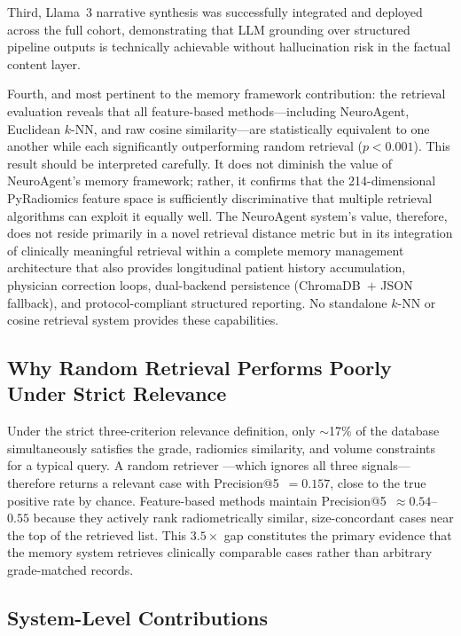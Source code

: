 \documentclass[journal]{IEEEtran}
\begin{document}
Third, Llama~3 narrative synthesis was successfully integrated and
deployed across the full cohort, demonstrating that LLM grounding over
structured pipeline outputs is technically achievable without hallucination
risk in the factual content layer.

Fourth, and most pertinent to the memory framework contribution: the
retrieval evaluation reveals that all feature-based methods---including
NeuroAgent, Euclidean $k$-NN, and raw cosine similarity---are statistically
equivalent to one another while each significantly outperforming random
retrieval ($p < 0.001$). This result should be interpreted carefully. It
does not diminish the value of NeuroAgent's memory framework; rather, it
confirms that the 214-dimensional PyRadiomics feature space is sufficiently
discriminative that multiple retrieval algorithms can exploit it equally
well. The NeuroAgent system's value, therefore, does not reside primarily
in a novel retrieval distance metric but in its integration of clinically
meaningful retrieval within a complete memory management architecture that
also provides longitudinal patient history accumulation, physician correction
loops, dual-backend persistence (ChromaDB~$+$ JSON fallback), and
protocol-compliant structured reporting. No standalone $k$-NN or cosine
retrieval system provides these capabilities.

\subsection{Why Random Retrieval Performs Poorly Under Strict Relevance}

Under the strict three-criterion relevance definition, only $\sim$17\%
of the database simultaneously satisfies the grade, radiomics similarity,
and volume constraints for a typical query. A random retriever
---which ignores all three signals---therefore returns a relevant case
with Precision@5~$= 0.157$, close to the true positive rate by chance.
Feature-based methods maintain Precision@5~$\approx 0.54$--$0.55$
because they actively rank radiometrically similar, size-concordant cases
near the top of the retrieved list. This $3.5\times$ gap constitutes the
primary evidence that the memory system retrieves clinically comparable
cases rather than arbitrary grade-matched records.

\subsection{System-Level Contributions}
\end{document}
